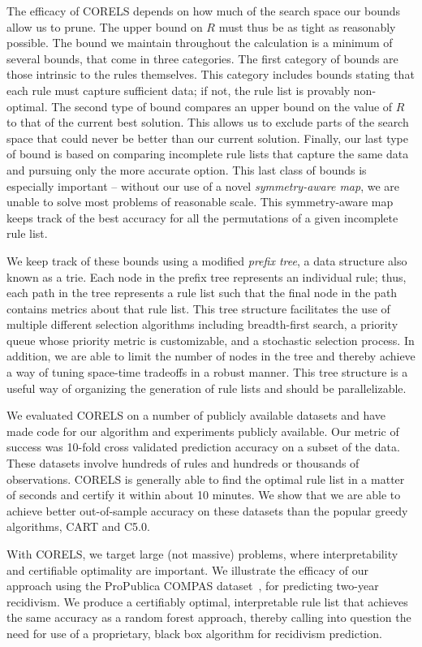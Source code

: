 The efficacy of CORELS depends on how much of the search space our bounds allow us to prune. The upper bound on $R$ must thus be as tight as reasonably possible. The bound we maintain throughout the calculation is a minimum of several bounds, that come in three categories. The first category of bounds are those intrinsic to the rules themselves. This category includes bounds stating that each rule must capture sufficient data; if not, the rule list is provably non-optimal. The second type of bound compares an upper bound on the value of $R$ to that of the current best solution. This allows us to exclude parts of the search space that could never be better than our current solution. Finally, our last type of bound is based on comparing incomplete rule lists that capture the same data and pursuing only the more accurate option. This last class of bounds is especially important -- without our use of a novel \textit{symmetry-aware map}, we are unable to solve most problems of reasonable scale. This symmetry-aware map keeps track of the best accuracy for all the permutations of a given incomplete rule list.

We keep track of these bounds using a modified \emph{prefix tree},
a data structure also known as a trie.
%
Each node in the prefix tree represents an individual rule;
thus, each path in the tree represents a rule list such that
the final node in the path contains metrics about that rule list.
%
This tree structure facilitates the use of multiple different selection algorithms including breadth-first search, a priority queue whose priority metric is customizable, and a stochastic selection process. In addition, we are able to limit the number of nodes in the tree and thereby achieve a way of tuning space-time tradeoffs in a robust manner. This tree structure is a useful way of organizing the generation of rule lists and should be parallelizable.

\begin{arxiv}
We evaluated CORELS on a number of publicly available datasets and have made code for our algorithm and experiments publicly available. Our metric of success was 10-fold cross validated prediction accuracy on a subset of the data. These datasets involve hundreds of rules and hundreds or thousands of observations. CORELS is generally able to find the optimal rule list in a matter of seconds and certify it within about 10 minutes. We show that we are able to achieve better out-of-sample accuracy on these datasets than the popular greedy algorithms, CART and C5.0.
\end{arxiv}

With CORELS, we target large (not massive) problems,
where interpretability and certifiable optimality are important.
%
We illustrate the efficacy of our approach using the ProPublica COMPAS dataset~\cite{LarsonMaKiAn16}, for predicting two-year recidivism.
%
We produce a certifiably optimal, interpretable rule list that achieves
the same accuracy as a random forest approach, thereby calling into question
the need for use of a proprietary, black box algorithm for recidivism prediction.

%
%
%
%
